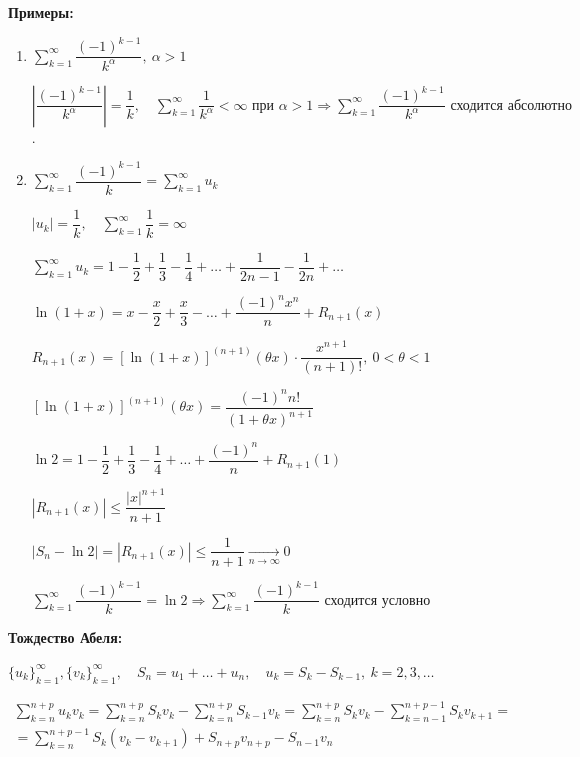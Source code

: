 \documentclass[a4paper,12pt]{article} %
\newcommand{\series}{\sum\limits_{k=1}^{\infty}}
\newcommand{\useries}{\sum\limits_{k=1}^{\infty} u_k}
\begin{document}
\textbf{Примеры:}

\begin{enumerate}
	\item $\series \dfrac{(-1)^{k-1}}{k^{\alpha}}, \ \alpha > 1$
	
	$\left| \dfrac{(-1)^{k-1}}{k^{\alpha}} \right| = \dfrac{1}{k}, \hspace{1em} \series \dfrac{1}{k^{\alpha}} < \infty \text{ при } \alpha > 1 \Rightarrow \series \dfrac{(-1)^{k-1}}{k^{\alpha}} \text{ сходится абсолютно}$.
	\item $\series \dfrac{(-1)^{k-1}}{k} = \useries$
	
	$|u_k| = \dfrac{1}{k}, \hspace{1em} \series \dfrac{1}{k} = \infty$
	
	$\useries = 1 - \dfrac{1}{2} + \dfrac{1}{3} - \dfrac{1}{4} + \ldots + \dfrac{1}{2n-1} - \dfrac{1}{2n} + \ldots$
	
	$\ln(1+x) = x - {\dfrac{x}{2}} + \dfrac{x}{3} - \ldots + \dfrac{(-1)^n x^n}{n} + R_{n+1}(x)$
	
	$R_{n+1}(x) = \left[ \ln(1+x) \right]^{(n+1)}(\theta x) \cdot \dfrac{x^{n+1}}{(n+1)!}, \ 0<\theta<1$
	
	$\left[ \ln(1+x) \right]^{(n+1)}(\theta x) = \dfrac{(-1)^n n!}{(1+\theta x)^{n+1}}$
	
	$\ln2 = 1 - \dfrac{1}{2} + \dfrac{1}{3} - \dfrac{1}{4} + \ldots + \dfrac{(-1)^n}{n} + R_{n+1}(1)$
	
	$\left| R_{n+1}(x) \right| \leqslant \dfrac{|x|^{n+1}}{n+1}$
	
	$\left| S_n - \ln2 \right| = \left| R_{n+1}(x) \right| \leqslant \dfrac{1}{n+1} \xrightarrow[n \to \infty]{} 0$
	
	$\series \dfrac{(-1)^{k-1}}{k} = \ln2 \Rightarrow \series \dfrac{(-1)^{k-1}}{k} \text{ сходится условно}$
\end{enumerate}

\textbf{Тождество Абеля:}

$\{u_k\}_{k=1}^{\infty}, \{v_k\}_{k=1}^{\infty}, \hspace{1em} S_n = u_1 + \ldots + u_n, \hspace{1em} u_k = S_k - S_{k-1}, \ k = 2, 3, \ldots $

\begin{multline*}
	\sum\limits_{k=n}^{n+p} u_k v_k = \sum\limits_{k=n}^{n+p} S_k v_k - \sum\limits_{k=n}^{n+p} S_{k-1} v_k = \sum\limits_{k=n}^{n+p} S_k v_k - \sum\limits_{k=n-1}^{n+p-1} S_ k v_{k+1} = \\ = \sum\limits_{k=n}^{n+p-1} S_k(v_k - v_{k+1}) + S_{n+p} v_{n+p} - S_{n-1} v_n
\end{multline*}
\end{document}
